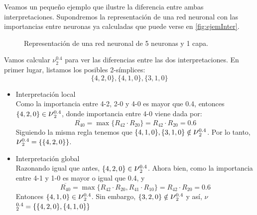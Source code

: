 \documentclass[12pt, a4paper, twoside]{book}
\numberwithin{equation}{section}
\theoremstyle{definition}
\newenvironment{ejem}
  {\pushQED{\qed}\renewcommand{\qedsymbol}{$\blacktriangleleft$}\ejemplo}
  {\popQED\endejemplo}
\theoremstyle{remark}
\theoremstyle{plain}
\begin{document}
	Veamos un pequeño ejemplo que ilustre la diferencia entre ambas 
	interpretaciones.
	\begin{ejem}
		\label{ej:int}
		Supondremos la representación de una red neuronal con 
		las importancias entre neuronas ya calculadas que puede verse 
		en \autoref{fig:ejemInter}.

		\begin{figure}[!htbp]
			\centering
			\caption{Representación de una red neuronal de 5 neuronas y 1 capa.}
			\label{fig:ejemInter}
		\end{figure}
		Vamos calcular {\Large $\nu$}$^{0.4}_{2}$ para ver las 
		diferencias entre las dos interpretaciones. En primer lugar, 
		listamos los posibles 2-símplices: 
		$$
		\{4,2,0\},\{4,1,0\},\{3,1,0\}
		$$
		\begin{itemize}
			\item{Interpretación local}\\
				Como la importancia entre 4-2, 2-0 y 4-0 es 
				mayor que 0.4, entonces $\{4,2,0\} \in 
				\text{{\Large $\nu$}}^{0.4}_{2}$,
				donde importancia entre 4-0 viene dada por:
				$$\overline{R_{40}}=\max\{R_{42} \cdot 
				R_{20}\}=R_{42} \cdot R_{20}=0.6$$
				Siguiendo la misma regla tenemos que 
				$\{4,1,0\},\{3,1,0\} \notin 
				\text{{\Large $\nu$}}^{0.4}_{2}$. Por lo 
				tanto,
				$\text{{\Large $\nu$}}^{0.4}_{2}=
				\{\{4,2,0\}\}$.
			\item{Interpretación global}\\
				Razonando igual que antes,$\ \{4,2,0\} \in 
				\text{{\Large $\nu$}}^{0.4}_{2}$. Ahora bien, 
				como la importancia entre 4-1 y 1-0 es mayor o 
				igual que 0.4, y 
				$$\overline{R_{40}}=\max\{R_{42} \cdot 
				R_{20},R_{41} \cdot R_{10}\}=R_{42} \cdot 
				R_{20}=0.6$$ 
				Entonces $\{4,1,0\} \in 
				\text{{\Large $\nu$}}^{0.4}_{2}$. Sin embargo, 
				$\{3,2,0\} \notin 
				\text{{\Large $\nu$}}^{0.4}_{2}$ y así, 
				{\Large $\nu$}$^{0.4}_{2}=\{\{4,2,0\},\\  
				\{4,1,0\}\}$
		\end{itemize}
	\end{ejem}
\end{document}
